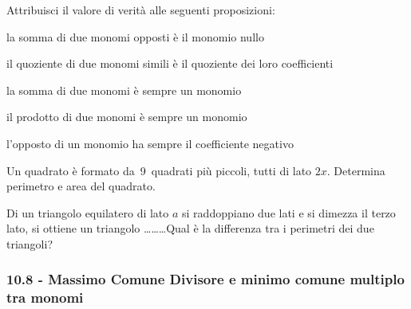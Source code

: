\begin{esercizio}[\Ast]
 \label{ese:10.41} %
Attribuisci il valore di verità alle seguenti proposizioni:
\TabPositions{11cm}
\begin{enumeratea}
 \item la somma di due monomi opposti è il monomio nullo \tab\boxV\quad\boxF
 \item il quoziente di due monomi simili è il quoziente dei loro coefficienti \tab\boxV\quad\boxF
 \item la somma di due monomi è sempre un monomio \tab\boxV\quad\boxF
 \item il prodotto di due monomi è sempre un monomio \tab\boxV\quad\boxF
 \item l'opposto di un monomio ha sempre il coefficiente negativo \tab\boxV\quad\boxF
\end{enumeratea}
\end{esercizio}

\begin{esercizio}[\Ast]
 \label{ese:10.42} %
Un quadrato è formato da~9~quadrati più piccoli, tutti di lato $ 2x $. Determina perimetro e area del quadrato.
\end{esercizio}

\begin{esercizio}[\Ast]
 \label{ese:10.43} %
Di un triangolo equilatero di lato $ a $ si raddoppiano due lati e si dimezza il terzo lato, si ottiene un triangolo \ldots\ldots\ldots Qual è la differenza tra i perimetri dei due triangoli?
\end{esercizio}

\subsubsection*{10.8 - Massimo Comune Divisore e minimo comune multiplo tra monomi}

